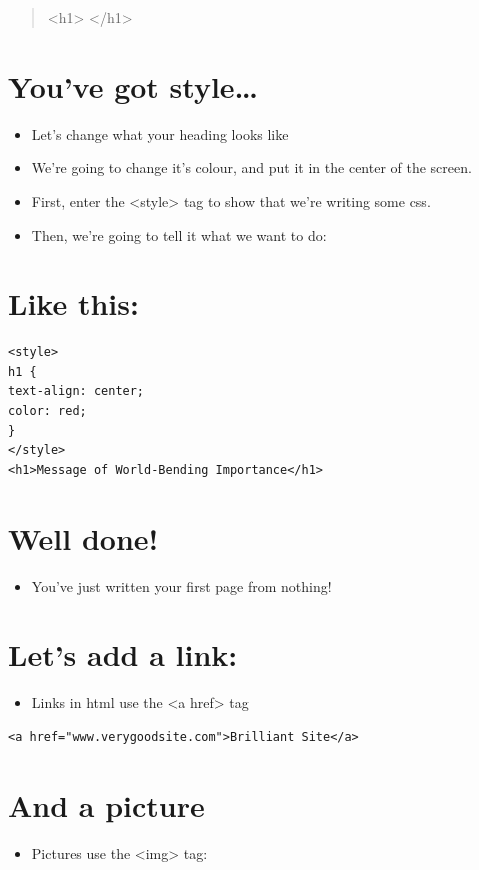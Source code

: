 \documentclass[11pt]{article}
\begin{document}
\begin{quote}
<h1> </h1>
\end{quote}

\section*{You've got style\ldots{}}
\label{sec:orgheadline6}
\begin{itemize}
\item Let's change what your heading looks like
\item We're going to change it's colour, and put it in the center of the screen.
\item First, enter the <style> tag to show that we're writing some css.
\item Then, we're going to tell it what we want to do:
\end{itemize}
\section*{Like this:}
\label{sec:orgheadline7}
\begin{verbatim}
<style> 
h1 { 
text-align: center;
color: red;
}
</style>
<h1>Message of World-Bending Importance</h1>
\end{verbatim}
\section*{Well done!}
\label{sec:orgheadline8}
\begin{itemize}
\item You've just written your first page from nothing!
\end{itemize}
\section*{Let's add a link:}
\label{sec:orgheadline9}
\begin{itemize}
\item Links in html use the <a href> tag
\end{itemize}
\begin{verbatim}
<a href="www.verygoodsite.com">Brilliant Site</a>
\end{verbatim}
\section*{And a picture}
\label{sec:orgheadline10}
\begin{itemize}
\item Pictures use the <img> tag:
\end{itemize}
\end{document}
